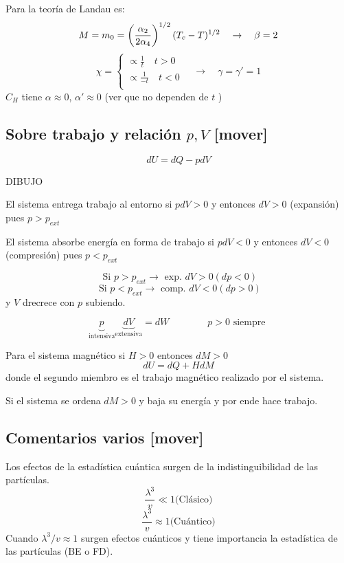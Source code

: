 \documentclass[10pt,oneside]{CBFT_book}
\begin{document}
Para la teoría de Landau es:
\[
	M = m_0 = \left( \frac{ \alpha_2 }{ 2\alpha_4 } \right)^{1/2}(T_c-T)^{1/2} \quad \to \quad \beta = 2
\]
\[
	\chi = \begin{cases}
		\propto \frac{1}{t} \quad t>0 \\
		\propto \frac{1}{-t} \quad t<0 \\
	       \end{cases} 
	\quad \to \quad \gamma = \gamma ' = 1       
\]
$C_H$ tiene $\alpha \approx 0$, $\alpha ' \approx 0 $ (ver que no dependen de $t$ )


\subsection{Sobre trabajo y relación $p,V$ [mover]}

\[ 
	dU = dQ - p dV
\]

DIBUJO 

El sistema entrega trabajo al entorno si $ pdV > 0 $ y entonces $ dV > 0 $ (expansión)
pues $ p > p_{ext} $

El sistema absorbe energía en forma de trabajo si $ pdV < 0 $ y entonces $ dV < 0 $ (compresión)
pues $ p < p_{ext} $

\[
	\text{ Si } p > p_{ext} \to \text{ exp. } dV > 0 (dp < 0)
\]
\[
	\text{ Si } p < p_{ext} \to \text{ comp. } dV < 0 (dp > 0)
\]
y $V$ drecrece con $p$ subiendo.

\[
	\underbrace{p}_{\text{intensiva}} \underbrace{dV}_{\text{extensiva}} = 
	dW \qquad \qquad p>0 \text{ siempre }
\]

Para el sistema magnético si $ H > 0 $ entonces $ dM > 0 $
\[
	dU = dQ + H dM
\]
donde el segundo miembro es el trabajo magnético realizado por el sistema.

Si el sistema se ordena $dM>0$ y baja su energía y por ende hace trabajo.

\subsection{Comentarios varios [mover]}

Los efectos de la estadística cuántica surgen de la indistinguibilidad de las partículas.
\[
	\frac{\lambda^3}{v} \ll 1 \text{(Clásico)}
\]
\[
	\frac{\lambda^3}{v} \approx 1 \text{(Cuántico)}
\]
Cuando $\lambda^3/v \approx 1$ surgen efectos cuánticos y tiene importancia la estadística de las
partículas (BE o FD).
\end{document}
